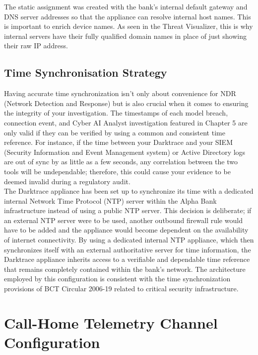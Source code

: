 \documentclass[12pt,a4paper]{report}
\begin{document}
The static assignment was created with the bank's internal default gateway and DNS server addresses so that the appliance can resolve internal host names. This is important to enrich device names. As seen in the Threat Visualizer, this is why internal servers have their fully qualified domain names in place of just showing their raw IP address.

\subsection{Time Synchronisation Strategy}

Having accurate time synchronization isn't only about convenience for NDR (Network Detection and Response) but is also crucial when it comes to ensuring the integrity of your investigation. The timestamps of each model breach, connection event, and Cyber AI Analyst investigation featured in Chapter 5 are only valid if they can be verified by using a common and consistent time reference. For instance, if the time between your Darktrace and your SIEM (Security Information and Event Management system) or Active Directory logs are out of sync by as little as a few seconds, any correlation between the two tools will be undependable; therefore, this could cause your evidence to be deemed invalid during a regulatory audit.\\

The Darktrace appliance has been set up to synchronize its time with a dedicated internal Network Time Protocol (NTP) server within the Alpha Bank infrastructure instead of using a public NTP server. This decision is deliberate; if an external NTP server were to be used, another outbound firewall rule would have to be added and the appliance would become dependent on the availability of internet connectivity. By using a dedicated internal NTP appliance, which then synchronizes itself with an external authoritative server for time information, the Darktrace appliance inherits access to a verifiable and dependable time reference that remains completely contained within the bank's network. The architecture employed by this configuration is consistent with the time synchronization provisions of BCT Circular 2006-19 related to critical security infrastructure.


\section{Call-Home Telemetry Channel Configuration}
\end{document}
